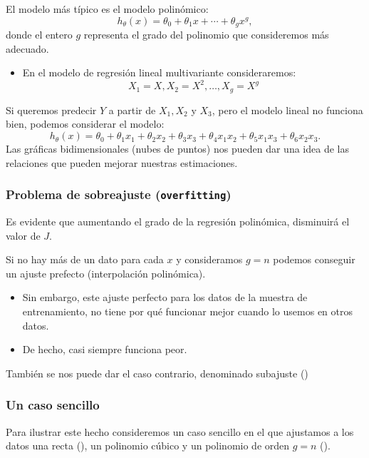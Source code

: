 El modelo más típico es el modelo polinómico: \[ h_\theta(x)=\theta_0+\theta_1x+\cdots+\theta_gx^g, \] donde el entero $g$ representa el grado del polinomio que consideremos más adecuado.

\begin{itemize}
	\item En el modelo de regresión lineal multivariante consideraremos: \[ X_1=X,X_2=X^2,\dots,X_g=X^g \]
\end{itemize}
 Si queremos predecir $Y$ a partir de $X_1,X_2$ y $X_3$, pero el modelo lineal no funciona bien, podemos considerar el modelo: \[ h_\theta(x)=\theta_0+\theta_1x_1+\theta_2x_2+\theta_3x_3+\theta_4x_1x_2+\theta_5x_1x_3+\theta_6x_2x_3. \]
Las gráficas bidimensionales (nubes de puntos) nos pueden dar una idea de las relaciones que pueden mejorar nuestras estimaciones.
\subsubsection{Problema de sobreajuste (\texttt{\textbf{overfitting}})}
Es evidente que aumentando el grado de la regresión polinómica, disminuirá el valor de $J$.

Si no hay más de un dato para cada $x$ y consideramos $g=n$ podemos conseguir un ajuste prefecto (interpolación polinómica).
\begin{itemize}
	\item Sin embargo, este ajuste perfecto para los datos de la muestra de entrenamiento, no tiene por qué funcionar mejor cuando lo usemos en otros datos.
	\item De hecho, casi siempre funciona peor.
\end{itemize}
También se nos puede dar el caso contrario, denominado subajuste ()
\subsubsection*{Un caso sencillo}
Para ilustrar este hecho consideremos un caso sencillo en el que ajustamos a los datos una recta (), un polinomio cúbico y un polinomio de orden $g=n$ ().

